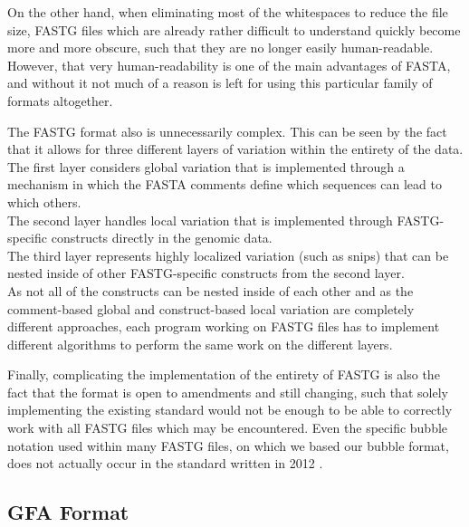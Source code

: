 \documentclass[a4paper,12pt,twoside,BCOR=10mm]{scrbook}
\begin{document}
On the other hand, when eliminating most of the whitespaces to reduce the file size, 
FASTG files which are already rather difficult to understand quickly 
become more and more obscure, such that they are no longer easily human-readable. 
However, that very human-readability is one of the main advantages of FASTA, 
and without it not much of a reason is left for using this particular family 
of formats altogether.

The FASTG format also is unnecessarily complex. This can be seen by the fact that 
it allows for three different layers of variation within the entirety of the data. \\
The first layer considers global variation that is implemented through a mechanism in which the 
FASTA comments define which sequences can lead to which others. \\
The second layer handles local variation that is implemented through FASTG-specific constructs 
directly in the genomic data. \\
The third layer represents highly localized variation (such as snips) that can be nested 
inside of other FASTG-specific constructs from the second layer. \\
As not all of the constructs can be nested inside of each other 
and as the comment-based global and construct-based local 
variation are completely different approaches, each program working on FASTG files 
has to implement different algorithms to perform the same work on the different layers.

Finally, complicating the implementation of the entirety of FASTG 
is also the fact that the format is open to amendments and still changing, 
such that solely implementing the existing standard would not be enough 
to be able to correctly work with all FASTG files which may be encountered. 
Even the specific bubble notation used within many FASTG files, 
on which we based our bubble format, 
does not actually occur in the standard written in 2012 \citep{specGFA1,specFASTG}.

\subsection{GFA Format}
\end{document}

